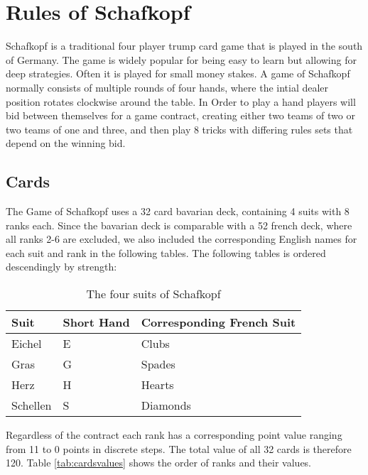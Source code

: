 \chapter{Rules of Schafkopf}
Schafkopf is a traditional four player trump card game that is played in the south of Germany.
The game is widely popular for being easy to learn but allowing for deep strategies.
Often it is played for small money stakes.
A game of Schafkopf normally consists of multiple rounds of four hands, where the intial dealer position rotates
clockwise around the table.
In Order to play a hand players will bid between themselves for a game contract, creating either two teams of two or
two teams of one and three, and then play 8 tricks with differing rules sets that depend on the winning bid.


\section{Cards}\label{sec:cards}
The Game of Schafkopf uses a 32 card bavarian deck, containing 4 suits with 8 ranks each.
Since the bavarian deck is comparable with a 52 french deck, where all ranks 2-6 are excluded, we also included the
corresponding English names for each suit and rank in the following tables.
The following tables is ordered descendingly by strength:
\newline
\begin{table}[h!]
    \centering
    \begin{tabular}{lll}
        \toprule
        Suit     & Short Hand & Corresponding French Suit \\
        \midrule
        Eichel   & E          & Clubs                     \\
        Gras     & G          & Spades                    \\
        Herz     & H          & Hearts                    \\
        Schellen & S          & Diamonds                  \\
        \bottomrule
    \end{tabular}
    \caption{The four suits of Schafkopf}
    \label{tab:suits}
\end{table}
\newline
Regardless of the contract each rank has a corresponding point value ranging from 11 to 0 points in discrete steps.
The total value of all 32 cards is therefore 120.
\newline
Table \ref{tab:cardsvalues} shows the order of ranks and their values.
